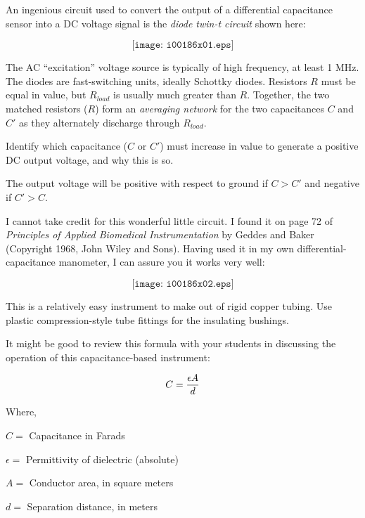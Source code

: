 

An ingenious circuit used to convert the output of a differential capacitance sensor into a DC voltage signal is the {\it diode twin-t circuit} shown here:

$$\texttt{[image: i00186x01.eps]}$$

The AC ``excitation'' voltage source is typically of high frequency, at least 1 MHz.  The diodes are fast-switching units, ideally Schottky diodes.  Resistors $R$ must be equal in value, but $R_{load}$ is usually much greater than $R$.  Together, the two matched resistors ($R$) form an {\it averaging network} for the two capacitances $C$ and $C'$ as they alternately discharge through $R_{load}$.

Identify which capacitance ($C$ or $C'$) must increase in value to generate a positive DC output voltage, and why this is so.







The output voltage will be positive with respect to ground if $C > C'$ and negative if $C' > C$.







I cannot take credit for this wonderful little circuit.  I found it on page 72 of {\it Principles of Applied Biomedical Instrumentation} by Geddes and Baker (Copyright 1968, John Wiley and Sons).  Having used it in my own differential-capacitance manometer, I can assure you it works very well:

$$\texttt{[image: i00186x02.eps]}$$

This is a relatively easy instrument to make out of rigid copper tubing.  Use plastic compression-style tube fittings for the insulating bushings.

\vskip 10pt

It might be good to review this formula with your students in discussing the operation of this capacitance-based instrument:

$$C = {\epsilon A \over d}$$

\noindent
Where,

$C =$ Capacitance in Farads

$\epsilon =$ Permittivity of dielectric (absolute)

$A =$ Conductor area, in square meters

$d =$ Separation distance, in meters





